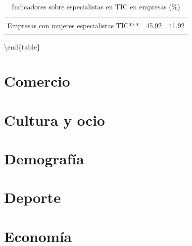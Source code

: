 \documentclass[
  10pt,
  a4paper,
  DIV=11,
  numbers=noendperiod]{scrreprt}
\begin{document}
\begin{table}
\caption{Indicadores sobre especialistas en TIC en empresas (\%)}\tabularnewline

\centering
\begin{tabular}[t]{lrr}
\toprule
\cellcolor[HTML]{FFF2CC}{Indicador} & \cellcolor[HTML]{FFF2CC}{CLM (\%)} & \cellcolor[HTML]{FFF2CC}{España (\%)}\\
\midrule
\cellcolor{gray!10}{Empresas que emplean especialistas en TIC*} & \cellcolor{gray!10}{8.48} & \cellcolor{gray!10}{15.67}\\
Empresas con mujeres especialistas TIC*** & 45.92 & 41.92\\
\cellcolor{gray!10}{Personal especialista TIC****} & \cellcolor{gray!10}{1.27} & \cellcolor{gray!10}{4.49}\\
\bottomrule
\end{tabular}
\end{table}

\textbackslash end\{table\}


\hypertarget{comercio}{%
\chapter{Comercio}\label{comercio}}


\hypertarget{cultura-y-ocio}{%
\chapter{Cultura y ocio}\label{cultura-y-ocio}}


\hypertarget{demografuxeda}{%
\chapter{Demografía}\label{demografuxeda}}


\hypertarget{deporte}{%
\chapter{Deporte}\label{deporte}}


\hypertarget{economuxeda}{%
\chapter{Economía}\label{economuxeda}}
\end{document}
